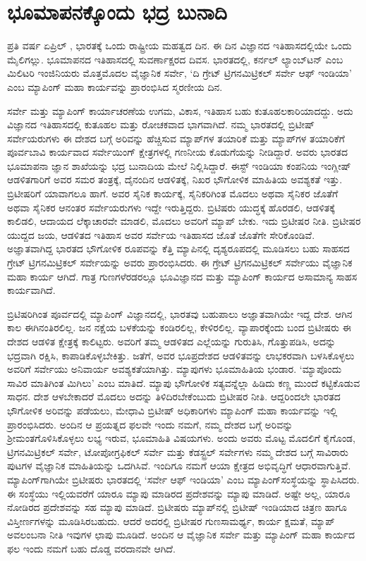 
\chapter{ಭೂಮಾಪನಕ್ಕೊಂದು ಭದ್ರ ಬುನಾದಿ}

ಪ್ರತಿ ವರ್ಷ ಏಪ್ರಿಲ್ ​, ಭಾರತಕ್ಕೆ ಒಂದು ರಾಷ್ಟ್ರೀಯ ಮಹತ್ವದ ದಿನ. ಈ ದಿನ ವಿಜ್ಞಾನದ ಇತಿಹಾಸದಲ್ಲಿಯೇ ಒಂದು ಮೈಲಿಗಲ್ಲು. ಭೂಮಾಪನದ ಇತಿಹಾಸದಲ್ಲಿ ಸುವರ್ಣಾಕ್ಷರದ ದಿವಸ. ಭಾರತದಲ್ಲಿ, ಕರ್ನಲ್​ ಲ್ಯಾಂಬ್​ಟನ್​ ಎಂಬ ಮಿಲಿಟರಿ ಇಂಜಿನಿಯರು ಮೊತ್ತಮೊದಲ ವೈಜ್ಞಾನಿಕ ಸರ್ವೇ, ‘ದಿ ಗ್ರೇಟ್​ ಟ್ರಿಗನಮಿಟ್ರಿಕಲ್​ ಸರ್ವೇ ಆಫ್​ ಇಂಡಿಯಾ’ ಎಂಬ ಮ್ಯಾಪಿಂಗ್​ ಮಹಾ ಕಾರ್ಯವನ್ನು ಪ್ರಾರಂಭಿಸಿದ ಸ್ಮರಣೀಯ ದಿನ.

ಸರ್ವೇ ಮತ್ತು ಮ್ಯಾಪಿಂಗ್​ ಕಾರ್ಯಾಚರಣೆಯ ಉಗಮ, ವಿಕಾಸ, ಇತಿಹಾಸ ಬಹು ಕುತೂಹಲಕಾರಿಯಾದದ್ದು. ಅದು ವಿಜ್ಞಾನದ ಇತಿಹಾಸದಲ್ಲಿ ಕುತೂಹಲ ಮತ್ತು ರೋಚಕವಾದ ಭಾಗವಾಗಿದೆ. ನಮ್ಮ ಭಾರತದಲ್ಲಿ ಬ್ರಿಟೀಷ್​ ಸರ್ವೇಯರುಗಳು ಈ ದೇಶದ ಬಗ್ಗೆ ಅರಿವನ್ನು ಹೆಚ್ಚಿಸುವ ಮ್ಯಾಪ್​ಗಳ ತಯಾರಿಕೆ ಮತ್ತು ಮ್ಯಾಪ್​ಗಳ ತಯಾರಿಕೆಗೆ ಪೂರ್ವಬಾವಿ ಕಾರ್ಯವಾದ ಸರ್ವೇಯಿಂಗ್​ ಕ್ಷೇತ್ರಗಳಲ್ಲಿ ಗಣನೀಯ ಕೊಡುಗೆಯನ್ನು ನೀಡಿದ್ದಾರೆ. ಅವರು ಭಾರತದ ಭೂಮಾಪನಾ ಜ್ಞಾನ ಶಾಖೆಯನ್ನು ಭದ್ರ ಬುನಾದಿಯ ಮೇಲೆ ನಿಲ್ಲಿಸಿದ್ದಾರೆ. ಈಸ್ಟ್​ ಇಂಡಿಯಾ ಕಂಪನಿಯ ಇಂಗ್ಲೀಷ್​ ಆಡಳಿತಗಾರಿಗೆ ಅವರ ಸಮರ ತಂತ್ರಕ್ಕೆ, ದೈನಂದಿನ ಆಡಳಿತಕ್ಕೆ, ನಿಖರ ಭೌಗೋಳಿಕ ಮಾಹಿತಿಯ ಅವಶ್ಯಕತೆ ಇತ್ತು. ಬ್ರಿಟೀಷರಿಗೆ ಯಾವಾಗಲೂ ಹಾಗೆ. ಅವರ ಸೈನಿಕ ಕಾರ್ಯಕ್ಕೆ, ಸೈನಿಕರಿಗಿಂತ ಮೊದಲು ಅಥವಾ ಸೈನಿಕರ ಜೊತೆಗೆ ಅಥವಾ ಸೈನಿಕರ ಆನಂತರ ಸರ್ವೇಯರುಗಳು ಇದ್ದೇ ಇರುತ್ತಿದ್ದರು. ಬ್ರಿಟಿಷರು ಯುದ್ಧಕ್ಕೆ ಹೊರಡಲಿ, ಆಡಳಿತಕ್ಕೆ ಕಾಲಿಡಲಿ, ಆದಾಯದ ಲೆಕ್ಕಾಚಾರವೇ ಮಾಡಲಿ, ಮೊದಲು ಅವರಿಗೆ ಮ್ಯಾಪ್​ ಬೇಕು. ಇದು ಬ್ರಿಟೀಷರ ನೀತಿ. ಬ್ರಿಟೀಷರ ಯುದ್ದದ ಜಯ, ಆಡಳಿತದ ಇತಿಹಾಸ ಅವರ ಸರ್ವೇಯ ಇತಿಹಾಸದ ಜೊತೆ ಜೊತೆಗೇ ಸೇರಿಕೊಂಡಿವೆ. ಅಜ್ಞಾತವಾಗಿದ್ದ ಭಾರತದ ಭೌಗೋಳಿಕ ರೂಪವನ್ನು ಕೆತ್ತಿ ಮ್ಯಾಪಿನಲ್ಲಿ ದೃಶ್ಯರೂಪದಲ್ಲಿ ಮೂಡಿಸಲು ಬಹು ಸಾಹಸದ ಗ್ರೇಟ್​ ಟ್ರಿಗನಮಿಟ್ರಿಕಲ್​ ಸರ್ವೇಯನ್ನು ಅವರು ಪ್ರಾರಂಭಿಸಿದರು. ಈ ಗ್ರೇಟ್​ ಟ್ರಿಗನಮಿಟ್ರಿಕಲ್​ ಸರ್ವೇಯು ವೈಜ್ಞಾನಿಕ ಮಹಾ ಕಾರ್ಯ ಆಗಿದೆ. ಗಾತ್ರ ಗುಣಗಳೆರಡರಲ್ಲೂ ಭೂವಿಜ್ಞಾನದ ಮತ್ತು ಮ್ಯಾಪಿಂಗ್​ ಕಾರ್ಯದ ಅಸಾಮಾನ್ಯ ಸಾಹಸ ಕಾರ್ಯವಾಗಿದೆ.

ಬ್ರಿಟಿಷರಿಗಿಂತ ಪೂರ್ವದಲ್ಲಿ ಮ್ಯಾಪಿಂಗ್​ ವಿಜ್ಞಾನದಲ್ಲಿ, ಭಾರತವು ಬಹುಪಾಲು ಅಜ್ಞಾತವಾಗಿಯೇ ಇದ್ದ ದೇಶ. ಆಗಿನ ಕಾಲ ಈಗಿನಂತಿರಲಿಲ್ಲ. ಜನ ನಕ್ಷೆಯ ಬಳಕೆಯನ್ನು ಕಂಡಿರಲಿಲ್ಲ, ಕೇಳಿರಲಿಲ್ಲ. ವ್ಯಾಪಾರಕ್ಕೆಂದು ಬಂದ ಬ್ರಿಟೀಷರು ಈ ದೇಶದ ಆಡಳಿತ ಕ್ಷೇತ್ರಕ್ಕೆ ಕಾಲಿಟ್ಟರು. ಅವರಿಗೆ ತಮ್ಮ ಆಡಳಿತದ ಎಲ್ಲೆಯನ್ನು ಗುರುತಿಸಿ, ಗೊತ್ತುಪಡಿಸಿ, ಅದನ್ನು ಭದ್ರವಾಗಿ ರಕ್ಷಿಸಿ, ಕಾಪಾಡಿಕೊಳ್ಳಬೇಕಿತ್ತು. ಜತೆಗೆ, ಅವರ ಭೂಪ್ರದೇಶದ ಆಡಳಿತವನ್ನು ಲಾಭಕರವಾಗಿ ಬಳಸಿಕೊಳ್ಳಲು ಅವರಿಗೆ ಸರ್ವೇಯು ಅನಿವಾರ್ಯ ಅವಶ್ಯಕತೆಯಾಗಿತ್ತು. ಮ್ಯಾಪುಗಳು ಭೂಮಾಹಿತಿಯ ಭಂಡಾರ. ‘ಮ್ಯಾಪೊಂದು ಸಾವಿರ ಮಾತಿಗಿಂತ ಮಿಗಿಲು’ ಎಂಬ ಮಾತಿದೆ. ಮ್ಯಾಪು ಭೌಗೋಳಿಕ ಸತ್ಯವನ್ನೆಲ್ಲಾ ಹಿಡಿದು ಕಣ್ಣ ಮುಂದೆ ಕಟ್ಟಿಕೊಡುವ ಸಾಧನ. ದೇಶ ಆಳಬೇಕಾದರೆ ಮೊದಲು ಅದನ್ನು ತಿಳಿದಿರಬೇಕೆಂಬುದು ಬ್ರಿಟೀಷರ ನೀತಿ. ಆದ್ದರಿಂದಲೇ ಭಾರತದ ಭೌಗೋಳಿಕ ಅರಿವನ್ನು ಪಡೆಯಲು, ಮೇಧಾವಿ ಬ್ರಿಟೀಷ್​ ಅಧಿಕಾರಿಗಳು ಮ್ಯಾಪಿಂಗ್​ ಮಹಾ ಕಾರ್ಯವನ್ನು ಇಲ್ಲಿ ಪ್ರಾರಂಭಿಸಿದರು. ಅಂದಿನ ಆ ಪ್ರಯತ್ನದ ಫಲವೇ ಇಂದು ನಮಗೆ, ನಮ್ಮ ದೇಶದ ಬಗ್ಗೆ ಅರಿವನ್ನು ಶ‍್ರೀಮಂತಗೊಳಿಸಿಕೊಳ್ಳಲು ಲಭ್ಯ ಇರುವ, ಭೂಮಾಹಿತಿ ವಿಷಯಗಳು. ಅಂದು ಅವರು ಮೊಟ್ಟ ಮೊದಲಿಗೆ ಕೈಗೊಂಡ, ಟ್ರಿಗನಮಿಟ್ರಿಕಲ್​ ಸರ್ವೇ, ಟೋಪೋಗ್ರಫಿಕಲ್​ ಸರ್ವೇ ಮತ್ತು ಕೆಡಸ್ಟ್ರಲ್​ ಸರ್ವೇಗಳು ನಮ್ಮ ದೇಶದ ಬಗ್ಗೆ ಸಾವಿರಾರು ಪುಟಗಳ ವೈಜ್ಞಾನಿಕ ಮಾಹಿತಿಯನ್ನು ಒದಗಿಸಿವೆ. ಇಂದಿಗೂ ನಮಗೆ ಆಯಾ ಕ್ಷೇತ್ರದ ಅಭಿವೃದ್ಧಿಗೆ ಆಧಾರವಾಗುತ್ತಿವೆ. ಮ್ಯಾಪಿಂಗ್​ಗಾಗಿಯೇ ಬ್ರಿಟೀಷರು ಭಾರತದಲ್ಲಿ ‘ಸರ್ವೇ ಆಫ್​ ಇಂಡಿಯಾ’ ಎಂಬ ಮ್ಯಾಪಿಂಗ್​ ಸಂಸ್ಥೆಯನ್ನು ಸ್ಥಾಪಿಸಿದರು. ಈ ಸಂಸ್ಥೆಯು ಇಲ್ಲಿಯವರೆಗೆ ಯಾರೂ ಮ್ಯಾಪು ಮಾಡಿರದ ಪ್ರದೇಶವನ್ನು ಮ್ಯಾಪು ಮಾಡಿದೆ. ಅಷ್ಟೇ ಅಲ್ಲ, ಯಾರೂ ನೋಡಿರದ ಪ್ರದೇಶವನ್ನು ಸಹ ಮ್ಯಾಪು ಮಾಡಿದೆ. ಬ್ರಿಟೀಷರು ಮ್ಯಾಪ್​ನಲ್ಲಿ ಬ್ರಿಟೀಷ್​ ಇಂಡಿಯಾದ ಚಿತ್ರಣ ಹಾಗೂ ವಿಸ್ತೀರ್ಣಗಳನ್ನು ಮೂಡಿಸಿರಬಹುದು. ಆದರೆ ಅದರಲ್ಲಿ ಬ್ರಿಟೀಷರ ಗುಣಸಾಮರ್ಥ್ಯ, ಕಾರ್ಯ ಕ್ಷಮತೆ, ಮ್ಯಾಪ್​ ಅವಲಂಬನಾ ನೀತಿ ಇವುಗಳ ಛಾಪು ಮೂಡಿದೆ. ಅಂದಿನ ಆ ವೈಜ್ಞಾನಿಕ ಸರ್ವೇ ಮತ್ತು ಮ್ಯಾಪಿಂಗ್​ ಮಹಾ ಕಾರ್ಯದ ಫಲ ಇಂದು ನಮಗೆ ಬಹು ದೊಡ್ಡ ವರದಾನವೇ ಆಗಿದೆ.

